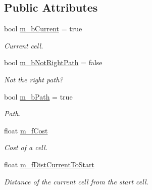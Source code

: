 \subsection*{Public Attributes}
\begin{DoxyCompactItemize}
\item 
\mbox{\label{class_cell_manager_a6d9c7fe60c4cffeb356eb8d04c944c6d}} 
bool \mbox{\hyperlink{class_cell_manager_a6d9c7fe60c4cffeb356eb8d04c944c6d}{m\+\_\+b\+Current}} = true
\begin{DoxyCompactList}\small\item\em Current cell. \end{DoxyCompactList}\item 
\mbox{\label{class_cell_manager_a4621ccf5a556eb4d32bccff37963fe81}} 
bool \mbox{\hyperlink{class_cell_manager_a4621ccf5a556eb4d32bccff37963fe81}{m\+\_\+b\+Not\+Right\+Path}} = false
\begin{DoxyCompactList}\small\item\em Not the right path? \end{DoxyCompactList}\item 
\mbox{\label{class_cell_manager_ad085500cc835dff8db164ecab6ec8a35}} 
bool \mbox{\hyperlink{class_cell_manager_ad085500cc835dff8db164ecab6ec8a35}{m\+\_\+b\+Path}} = true
\begin{DoxyCompactList}\small\item\em Path. \end{DoxyCompactList}\item 
\mbox{\label{class_cell_manager_a1c7d4f4799002779714caf97b795114c}} 
float \mbox{\hyperlink{class_cell_manager_a1c7d4f4799002779714caf97b795114c}{m\+\_\+f\+Cost}}
\begin{DoxyCompactList}\small\item\em Cost of a cell. \end{DoxyCompactList}\item 
\mbox{\label{class_cell_manager_a4646c59c088b6b8edafb9f40088976b5}} 
float \mbox{\hyperlink{class_cell_manager_a4646c59c088b6b8edafb9f40088976b5}{m\+\_\+f\+Dist\+Current\+To\+Start}}
\begin{DoxyCompactList}\small\item\em Distance of the current cell from the start cell. \end{DoxyCompactList}\item 

\end{DoxyCompactItemize}
